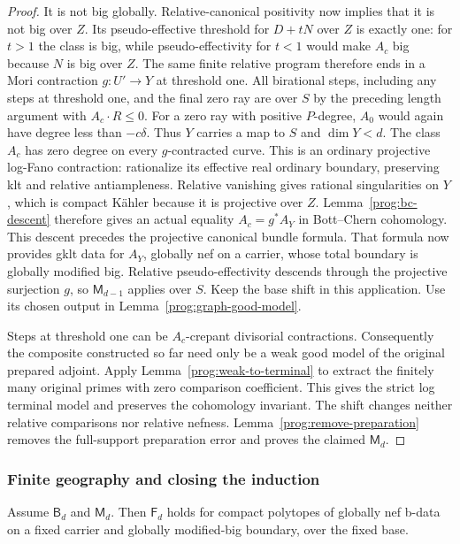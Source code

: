 \begin{proof}
It is not big globally. Relative-canonical positivity now implies
that it is not big over $Z$. Its pseudo-effective threshold for
$D+tN$ over $Z$ is exactly one: for $t>1$ the class is big, while
pseudo-effectivity for $t<1$ would make $A_c$ big because $N$ is
big over $Z$. The same finite relative program therefore ends in
a Mori contraction $g:U'\to Y$ at threshold one.
All birational steps, including any steps at threshold one, and
the final zero ray are over $S$ by the preceding length argument
with $A_c\cdot R\leq0$. For a zero ray with positive $P$-degree,
$A_0$ would again have degree less than $-c\delta$.
Thus $Y$ carries a map to $S$ and $\dim Y<d$.
The class $A_c$ has zero degree on every $g$-contracted curve.
This is an ordinary projective log-Fano contraction: rationalize its
effective real ordinary boundary, preserving klt and relative
antiampleness. Relative vanishing gives rational singularities on
$Y$, which is compact K\"ahler because it is projective over $Z$.
Lemma~\ref{prog:bc-descent} therefore gives an actual equality
$A_c=g^*A_Y$ in Bott--Chern cohomology. This descent precedes the
projective canonical bundle formula. That formula now provides gklt
data for $A_Y$, globally nef on a carrier, whose total boundary is
globally modified big. Relative pseudo-effectivity descends through
the projective surjection $g$, so $\mathsf M_{d-1}$ applies over $S$.
Keep the base shift in this application. Use its chosen output in
Lemma~\ref{prog:graph-good-model}.

Steps at threshold one can be $A_c$-crepant divisorial contractions.
Consequently the composite constructed so far need only be a weak
good model of the original prepared adjoint. Apply
Lemma~\ref{prog:weak-to-terminal} to extract the finitely many original
primes with zero comparison coefficient. This gives the strict log
terminal model and preserves the cohomology invariant. The shift
changes neither relative comparisons nor relative nefness.
Lemma~\ref{prog:remove-preparation} removes the full-support
preparation error and proves the claimed $\mathsf M_d$.
\end{proof}

\subsubsection{Finite geography and closing the induction}

\begin{lemma}
\label{prog:finite-geography}
Assume $\mathsf B_d$ and $\mathsf M_d$. Then $\mathsf F_d$ holds for compact polytopes
of globally nef b-data on a fixed carrier and globally modified-big
boundary, over the fixed base.
\end{lemma}


